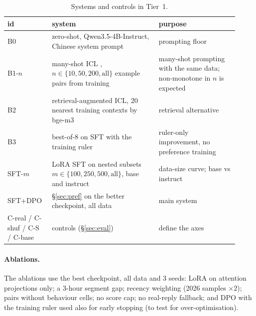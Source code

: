 \begin{table}[t]
\centering
\caption{Systems and controls in Tier~1.}
\label{tab:systems}
\begin{tabular}{@{}p{0.17\linewidth}p{0.43\linewidth}p{0.32\linewidth}@{}}
\toprule
id & system & purpose \\
\midrule
B0 & zero-shot, Qwen3.5-4B-Instruct, Chinese system prompt & prompting floor \\
B1-$n$ & many-shot ICL \citep{agarwal2024manyshot}, $n \in \{10, 50, 200, \text{all}\}$ example pairs from training & many-shot prompting with the same data; non-monotone in $n$ is expected \\
B2 & retrieval-augmented ICL, 20 nearest training contexts by bge-m3 & retrieval alternative \\
B3 & best-of-8 on SFT with the training ruler & ruler-only improvement, no preference training \\
SFT-$m$ & LoRA SFT on nested subsets $m \in \{100, 250, 500, \text{all}\}$, base and instruct & data-size curve; base vs instruct \\
SFT+DPO & \S\ref{sec:pref} on the better checkpoint, all data & main system \\
C-real / C-shuf / C-S / C-base & controls (\S\ref{sec:eval}) & define the axes \\
\bottomrule
\end{tabular}
\end{table}

\paragraph{Ablations.}
The ablations use the best checkpoint, all data and 3 seeds: LoRA on attention projections only; a 3-hour segment gap; recency weighting (2026 samples $\times 2$); pairs without behaviour cells; no score cap; no real-reply fallback; and DPO with the training ruler used also for early stopping (to test for over-optimisation).

